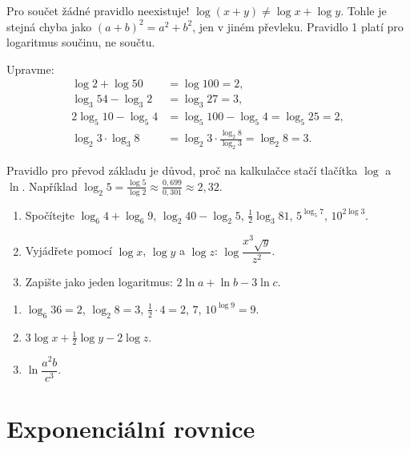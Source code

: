 \begin{note}
  Pro součet žádné pravidlo neexistuje! $\log(x + y)\neq\log x + \log y$. Tohle je stejná chyba jako ${(a + b)}^2 = a^2 + b^2$, jen v jiném převleku. Pravidlo 1 platí pro logaritmus součinu, ne součtu.
\end{note}

\begin{example}
  Upravme:
  \begin{align*}
    \log 2 + \log 50 &= \log 100 = 2,\\
    \log_3 54 - \log_3 2 &= \log_3 27 = 3,\\
    2\log_5 10 - \log_5 4 &= \log_5 100 - \log_5 4 = \log_5 25 = 2,\\
    \log_2 3\cdot\log_3 8 &= \log_2 3\cdot\frac{\log_2 8}{\log_2 3} = \log_2 8 = 3.
  \end{align*}
\end{example}

\begin{note}
  Pravidlo pro převod základu je důvod, proč na kalkulačce stačí tlačítka $\log$ a $\ln$. Například $\log_2 5 = \frac{\log 5}{\log 2}\approx\frac{0{,}699}{0{,}301}\approx 2{,}32$.
\end{note}

\begin{problem}
  \begin{enumerate}[label=(\alph*)]
    \item Spočítejte $\log_6 4 + \log_6 9$, $\log_2 40 - \log_2 5$, $\frac{1}{2}\log_3 81$, $5^{\log_5 7}$, $10^{2\log 3}$.
    \item Vyjádřete pomocí $\log x$, $\log y$ a $\log z$: $\log\dfrac{x^3\sqrt{y}}{z^2}$.
    \item Zapište jako jeden logaritmus: $2\ln a + \ln b - 3\ln c$.
  \end{enumerate}
\end{problem}

\begin{solution}
  \begin{enumerate}[label=(\alph*)]
    \item $\log_6 36 = 2$, $\log_2 8 = 3$, $\frac{1}{2}\cdot 4 = 2$, $7$, $10^{\log 9} = 9$.
    \item $3\log x + \frac{1}{2}\log y - 2\log z$.
    \item $\ln\dfrac{a^2b}{c^3}$.
  \end{enumerate}
\end{solution}

\section{Exponenciální rovnice}\label{sec:exponencialni-rovnice}

